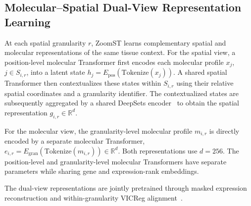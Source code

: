 \subsection{Molecular--Spatial Dual-View Representation Learning}
\label{sec:within-granularity}

At each spatial granularity $r$, ZoomST learns complementary spatial and molecular representations of the same tissue context. For the spatial view, a position-level molecular Transformer first encodes each molecular profile $x_j$, $j\in S_{i,r}$, into a latent state $h_j=E_{\mathrm{pos}}(\mathrm{Tokenize}(x_j))$.
A shared spatial Transformer then contextualizes these states within $S_{i,r}$ using their relative spatial coordinates and a granularity identifier. The contextualized states are subsequently aggregated by a shared DeepSets encoder~\citep{zaheer2017deepsets} to obtain the spatial representation $g_{i,r}\in\mathbb{R}^{d}$.

For the molecular view, the granularity-level molecular profile $m_{i,r}$ is directly encoded by a separate molecular Transformer, $e_{i,r}=E_{\mathrm{gran}}(\mathrm{Tokenize}(m_{i,r}))\in\mathbb{R}^{d}$.
Both representations use $d=256$. The position-level and granularity-level molecular Transformers have separate parameters while sharing gene and expression-rank embeddings.

The dual-view representations are jointly pretrained through masked expression reconstruction and within-granularity VICReg alignment~\citep{bardes2022vicreg}.
